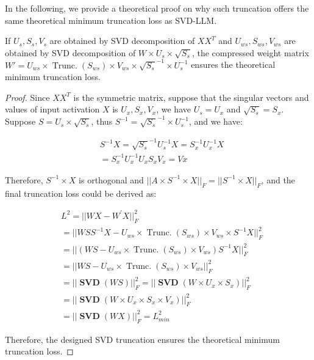 In the following, we provide a theoretical proof on why such truncation offers the same theoretical minimum truncation loss as SVD-LLM.

\begin{theorem}
\label{thm:whitening}
If $U_s, S_s, V_s$ are obtained by SVD decomposition of $XX^T$ and $U_{ws}, S_{ws}, V_{ws}$ are obtained by SVD decomposition of $W\times U_s\times \sqrt{S_s}$, the compressed weight matrix $W' = U_{ws}\times \boldsymbol{\operatorname{Trunc.}}(S_{ws}) \times V_{ws} \times \sqrt{S_{s}}^{-1} \times U_{s}^{-1}$ ensures the theoretical minimum truncation loss.
\end{theorem}

\begin{proof}
\label{proof:truncation}
Since $XX^T$ is the symmetric matrix, suppose that the singular vectors and values of input activation $X$ is $U_x, S_x, V_x$, we have $U_s = U_x$ and $\sqrt{S_s} = S_x$. Suppose $S = U_s\times \sqrt{S_s}$, thus $S^{-1} = \sqrt{S_{s}}^{-1} \times U_{s}^{-1}$, and we have:

{\small
\begin{equation}
    \begin{aligned}
        &S^{-1} X = \sqrt{S_{s}}^{-1} U_{s}^{-1} X = S_{x}^{-1} U_{x}^{-1} X\\
        &= S_{x}^{-1} U_{x}^{-1} U_x S_x V_x = Vx
    \end{aligned}
\label{formula:derive}
\end{equation}
}

\noindent Therefore, $S^{-1}\times X$ is orthogonal and $||A\times S^{-1}\times X||_F = ||S^{-1}\times X||_F$, and the final truncation loss could be derived as:

{\small
\begin{equation}
    \begin{aligned}
        &L^2 =||W X-W^{\prime} X||_F^2 \\
        &= ||WSS^{-1}X - U_{ws}\times \boldsymbol{\operatorname{Trunc.}}(S_{ws}) \times V_{ws} \times S^{-1} X||_F^2\\
        &= ||(WS - U_{ws}\times \boldsymbol{\operatorname{Trunc.}}(S_{ws}) \times V_{ws})S^{-1}X||_F^2\\
        &= ||WS - U_{ws}\times \boldsymbol{\operatorname{Trunc.}}(S_{ws}) \times V_{ws}||_F^2\\
        &= ||\boldsymbol{\operatorname{SVD}}(WS)||_F^2 = ||\boldsymbol{\operatorname{SVD}}(W\times U_x\times S_x)||_F^2\\
        & = ||\boldsymbol{\operatorname{SVD}}(W\times U_x\times S_x\times V_x)||_F^2\\
        & = ||\boldsymbol{\operatorname{SVD}}(WX)||_F^2 = L_{min} ^2
    \end{aligned}
\label{formula:loss_1}
\end{equation}
}

\noindent Therefore, the designed SVD truncation ensures the theoretical minimum truncation loss.
\end{proof}


